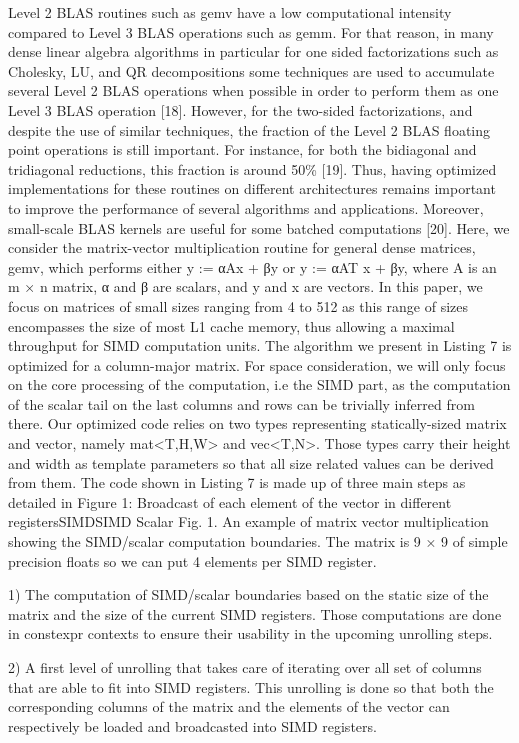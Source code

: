 \documentclass[../../main.tex]{subfiles}
\begin{document}
Level 2 BLAS routines such as gemv have a low
computational intensity compared to Level 3 BLAS operations
such as gemm. For that reason, in many dense linear algebra
algorithms in particular for one sided factorizations such as
Cholesky, LU, and QR decompositions some techniques are
used to accumulate several Level 2 BLAS operations when
possible in order to perform them as one Level 3 BLAS
operation [18]. However, for the two-sided factorizations,
and despite the use of similar techniques, the fraction of the
Level 2 BLAS floating point operations is still important. For
instance, for both the bidiagonal and tridiagonal reductions,
this fraction is around 50\% [19]. Thus, having optimized
implementations for these routines on different architectures
remains important to improve the performance of several
algorithms and applications. Moreover, small-scale BLAS
kernels are useful for some batched computations [20].
Here, we consider the matrix-vector multiplication routine
for general dense matrices, gemv, which performs either
y := αAx + βy or y := αAT x + βy, where A is an m × n
matrix, α and β are scalars, and y and x are vectors. In
this paper, we focus on matrices of small sizes ranging from
4 to 512 as this range of sizes encompasses the size of
most L1 cache memory, thus allowing a maximal throughput
for SIMD computation units. The algorithm we present in
Listing 7 is optimized for a column-major matrix. For space
consideration, we will only focus on the core processing of
the computation, i.e the SIMD part, as the computation of
the scalar tail on the last columns and rows can be trivially
inferred from there.
Our optimized code relies on two types representing
statically-sized matrix and vector, namely mat<T,H,W>
and vec<T,N>. Those types carry their height and width
as template parameters so that all size related values can be
derived from them. The code shown in Listing 7 is made up
of three main steps as detailed in Figure 1:
Broadcast of each element of
the vector in different registersSIMDSIMD Scalar
Fig. 1. An example of matrix vector multiplication showing the SIMD/scalar
computation boundaries. The matrix is 9 × 9 of simple precision floats so we
can put 4 elements per SIMD register.

1) The computation of SIMD/scalar boundaries based
on the static size of the matrix and the size of the
current SIMD registers. Those computations are done
in constexpr contexts to ensure their usability in the
upcoming unrolling steps.

2) A first level of unrolling that takes care of iterating
over all set of columns that are able to fit into SIMD
registers. This unrolling is done so that both the
corresponding columns of the matrix and the elements
of the vector can respectively be loaded and broadcasted
into SIMD registers.
\end{document}
